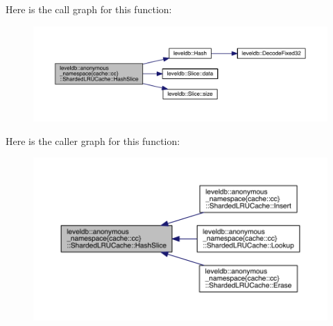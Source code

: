 Here is the call graph for this function\+:
\nopagebreak
\begin{figure}[H]
\begin{center}
\leavevmode
\includegraphics[width=350pt]{classleveldb_1_1anonymous__namespace_02cache_8cc_03_1_1_sharded_l_r_u_cache_ad26bfc7ac1209a9554b64e6037da48d3_cgraph}
\end{center}
\end{figure}




Here is the caller graph for this function\+:
\nopagebreak
\begin{figure}[H]
\begin{center}
\leavevmode
\includegraphics[width=350pt]{classleveldb_1_1anonymous__namespace_02cache_8cc_03_1_1_sharded_l_r_u_cache_ad26bfc7ac1209a9554b64e6037da48d3_icgraph}
\end{center}
\end{figure}


\hypertarget{classleveldb_1_1anonymous__namespace_02cache_8cc_03_1_1_sharded_l_r_u_cache_ac41fbfba6e82426c93908e2031f68097}{}
